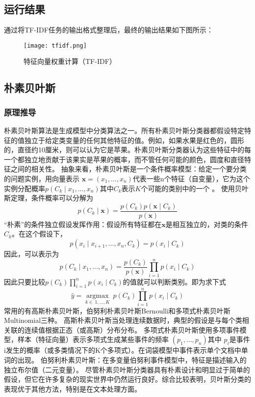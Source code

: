 \documentclass[lang=cn,11pt]{elegantpaper}
\begin{document}
\subsection{运行结果}
通过将TF-IDF任务的输出格式整理后，最终的输出结果如下图所示：
\begin{figure}[!htbp]
	\centering
	\texttt{[image: tfidf.png]}
	\caption{特征向量权重计算（TF-IDF） \label{fig:tfidf}}
\end{figure}
\subsection{朴素贝叶斯}
\subsubsection{原理推导}
朴素贝叶斯算法是生成模型中分类算法之一。所有朴素贝叶斯分类器都假设特定特征的值独立于给定类变量的任何其他特征的值。例如，如果水果是红色的，圆形的，直径约10厘米，则可以认为它是苹果。朴素贝叶斯分类器认为这些特征中的每一个都独立地贡献于该果实是苹果的概率，而不管任何可能的颜色，圆度和直径特征之间的相关性。
抽象来看，朴素贝叶斯是一个条件概率模型：给定一个要分类的问题实例，用向量表示 $ \mathbf {x} =(x_ {1} , \dots, x_ {n})$代表一些n个特征（自变量），它为这个实例分配概率$p(C_ {k} \mid x_ {1}, \dots, x_ {n})$其中$C_{k}$表示$K$个可能的类别中的一个 。
使用贝叶斯定理，条件概率可以分解为
$$p(C_ {k} \mid \mathbf {x})= {\frac {p(C_ {k})p (\mathbf {x} \mid C_ {k})} {p(\mathbf {x} )}}$$
“朴素”的条件独立假设发挥作用：假设所有特征都在$\mathbf {x}$是相互独立的，对类的条件$ C_ {k}$。在这个假设下，
$$p(x_ {i}\mid x_ {i+1},\dots,x_ {n},C_ {k})= p(x_ {i} \mid C_ {k})$$
因此，可以表示为
$$p(C_ {k} \mid x_ {1},\dots,x_ {n})= \frac{p(C_ {k})}{p(\mathbf {x})}\prod_ {i = 1}^{n} p(x_ {i} \mid C_ {k})$$
因此只要比较$p(C_ {k})\prod_ {i = 1}^{n} p(x_ {i} \mid C_ {k})$的值就可以判断类别。即为求下式
$$\hat{y} = {\underset {k \in \ {1,\dots,K}} {\operatorname {argmax}}} \ p(C_ {k})\prod_{i = 1} ^ {n} p(x_ {i} \mid C_ {k})$$
常用的有高斯朴素贝叶斯，伯努利朴素贝叶斯Bernoulli和多项式朴素贝叶斯Multinomial三种。
高斯朴素贝叶斯当处理连续数据时，典型的假设是与每个类相关联的连续值根据正态（或高斯）分布分布。
多项式朴素贝叶斯使用多项事件模型，样本（特征向量）表示多项式生成某些事件的频率 $(p_ {1},\dots,p_ {n})$其中 $p_i$是事件i发生的概率（或多类情况下的K个多项式）。在词袋模型中事件表示单个文档中单词的出现。
伯努利朴素贝叶斯：在多变量伯努利事件模型中，特征是描述输入的独立布尔值（二元变量）。
尽管朴素贝叶斯分类器具有朴素设计和明显过于简单的假设，但它在许多复杂的现实世界中仍然运行良好。综合比较表明，贝叶斯分类的表现优于其他方法，特别是在文本处理方面。
\end{document}
